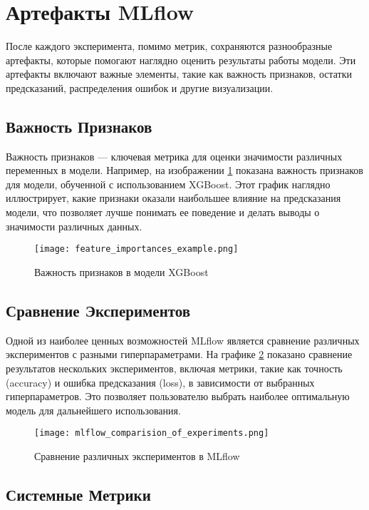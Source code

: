 \documentclass[14pt, a4paper]{src/bsu}
\begin{document}
\section{Артефакты MLflow}

После каждого эксперимента, помимо метрик, сохраняются
разнообразные артефакты, которые помогают наглядно оценить
результаты работы модели. Эти артефакты включают важные элементы,
такие как важность признаков, остатки предсказаний, распределения
ошибок и другие визуализации.

\subsection{Важность Признаков}

Важность признаков — ключевая метрика для оценки значимости
различных переменных в модели. Например, на изображении
\ref{fig:feature_importances} показана важность признаков для
модели, обученной с использованием XGBoost. Этот график наглядно
иллюстрирует, какие признаки оказали наибольшее влияние на
предсказания модели, что позволяет лучше понимать ее поведение и
делать выводы о значимости различных данных.

\begin{figure}[h!] \centering
	\texttt{[image: feature\_importances\_example.png]}
	\caption{Важность признаков в модели XGBoost}
	\label{fig:feature_importances} \end{figure}

\subsection{Сравнение Экспериментов}

Одной из наиболее ценных возможностей MLflow является сравнение
различных экспериментов с разными гиперпараметрами. На графике
\ref{fig:mlflow_comparison} показано сравнение результатов
нескольких экспериментов, включая метрики, такие как точность
(accuracy) и ошибка предсказания (loss), в зависимости от выбранных
гиперпараметров. Это позволяет пользователю выбрать наиболее
оптимальную модель для дальнейшего использования.

\begin{figure}[h!] \centering
	\texttt{[image: mlflow\_comparision\_of\_experiments.png]}
	\caption{Сравнение различных экспериментов в MLflow}
	\label{fig:mlflow_comparison} \end{figure}

\subsection{Системные Метрики}
\end{document}
